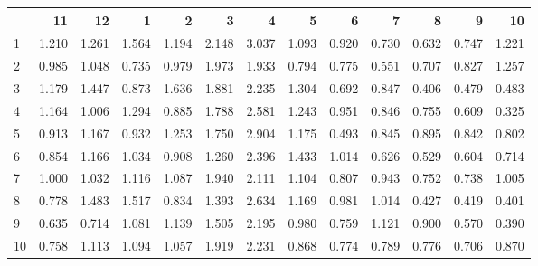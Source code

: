 \begin{tabular}{lrrrrrrrrrrrr}
\toprule
{} &     11 &     12 &     1  &     2  &     3  &     4  &     5  &     6  &     7  &     8  &     9  &     10 \\
\midrule
1  &  1.210 &  1.261 &  1.564 &  1.194 &  2.148 &  3.037 &  1.093 &  0.920 &  0.730 &  0.632 &  0.747 &  1.221 \\
2  &  0.985 &  1.048 &  0.735 &  0.979 &  1.973 &  1.933 &  0.794 &  0.775 &  0.551 &  0.707 &  0.827 &  1.257 \\
3  &  1.179 &  1.447 &  0.873 &  1.636 &  1.881 &  2.235 &  1.304 &  0.692 &  0.847 &  0.406 &  0.479 &  0.483 \\
4  &  1.164 &  1.006 &  1.294 &  0.885 &  1.788 &  2.581 &  1.243 &  0.951 &  0.846 &  0.755 &  0.609 &  0.325 \\
5  &  0.913 &  1.167 &  0.932 &  1.253 &  1.750 &  2.904 &  1.175 &  0.493 &  0.845 &  0.895 &  0.842 &  0.802 \\
6  &  0.854 &  1.166 &  1.034 &  0.908 &  1.260 &  2.396 &  1.433 &  1.014 &  0.626 &  0.529 &  0.604 &  0.714 \\
7  &  1.000 &  1.032 &  1.116 &  1.087 &  1.940 &  2.111 &  1.104 &  0.807 &  0.943 &  0.752 &  0.738 &  1.005 \\
8  &  0.778 &  1.483 &  1.517 &  0.834 &  1.393 &  2.634 &  1.169 &  0.981 &  1.014 &  0.427 &  0.419 &  0.401 \\
9  &  0.635 &  0.714 &  1.081 &  1.139 &  1.505 &  2.195 &  0.980 &  0.759 &  1.121 &  0.900 &  0.570 &  0.390 \\
10 &  0.758 &  1.113 &  1.094 &  1.057 &  1.919 &  2.231 &  0.868 &  0.774 &  0.789 &  0.776 &  0.706 &  0.870 \\
\bottomrule
\end{tabular}
